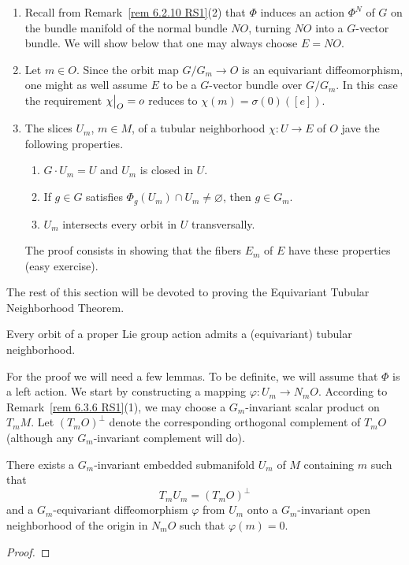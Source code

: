 \begin{rem}
    \begin{enumerate}
        \item Recall from Remark~\ref{rem 6.2.10 RS1}(2) that $\Phi$ induces an action $\Phi^N$ of $G$ on the bundle manifold of the normal bundle $NO$, turning $NO$ into a $G$-vector bundle. We will show below that one may always choose $E=NO$.
        \item Let $m\in O$. Since the orbit map $G\slash G_m\to O$ is an equivariant diffeomorphism, one might as well assume $E$ to be a $G$-vector bundle over $G\slash G_m$. In this case the requirement $\restr{\chi}{O}=o$ reduces to $\chi(m)=\sigma(0)([e])$.
        \item  The slices $U_m$, $m\in M$, of a tubular neighborhood $\chi:U\to E$ of $O$ jave the following properties.
        \begin{enumerate}[label=(\alph*)]
            \item $G\cdot U_m=U$ and $U_m$ is closed in $U$.
            \item If $g\in G$ satisfies $\Phi_g(U_m)\cap U_m\neq \varnothing$, then $g\in G_m$.
            \item $U_m$ intersects every orbit in $U$ transversally.
        \end{enumerate}
        The proof consists in showing that the fibers $E_m$ of $E$ have these properties (easy exercise).
    \end{enumerate}
\end{rem}

The rest of this section will be devoted to proving the Equivariant Tubular Neighborhood Theorem.

\begin{thm}\label{thm 6.4.3 RS1 equiv tubular neighb}
    Every orbit of a proper Lie group action admits a (equivariant) tubular neighborhood.
\end{thm}

For the proof we will need a few lemmas. To be definite, we will assume that $\Phi$ is a left action. We start by constructing a mapping $\varphi:U_m\to N_mO$. According to Remark~\ref{rem 6.3.6 RS1}(1), we may choose a $G_m$-invariant scalar product on $T_mM$. Let $(T_mO)^\perp$ denote the corresponding orthogonal complement of $T_mO$ (although any $G_m$-invariant complement will do).

\begin{lem}[{{\cite[Lem.~6.4.4]{RS1}}}]\label{lem 6.4.4 RS1}
    There exists a $G_m$-invariant embedded submanifold $U_m$ of $M$ containing $m$ such that 
    \[T_mU_m=(T_mO)^\perp\]
    and a $G_m$-equivariant diffeomorphism $\varphi$ from $U_m$ onto a $G_m$-invariant open neighborhood of the origin in $N_mO$ such that $\varphi(m)=0$.
\end{lem}
\begin{proof}
    
\end{proof}

